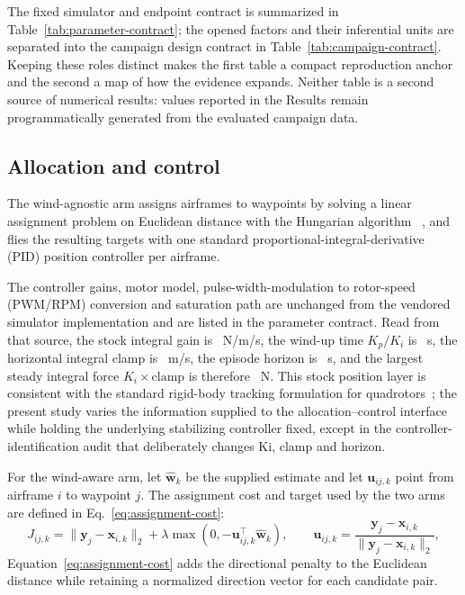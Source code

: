 The fixed simulator and endpoint contract is summarized in
Table~\ref{tab:parameter-contract}; the opened factors and their inferential
units are separated into the campaign design contract in
Table~\ref{tab:campaign-contract}. Keeping these roles distinct makes the first
table a compact reproduction anchor and the second a map of how the evidence
expands. Neither table is a second source of numerical results: values reported
in the Results remain programmatically generated from the evaluated campaign data.



\subsection{Allocation and control}

The wind-agnostic arm assigns airframes to waypoints by solving a linear
assignment problem on Euclidean distance with the Hungarian algorithm
~\cite{kuhn1955hungarian,gerkey2004formal,dias2006market,choi2009cbba}, and flies
the resulting targets with one standard proportional-integral-derivative (PID)
position controller per airframe.

The controller gains, motor model, pulse-width-modulation to rotor-speed (PWM/RPM) conversion and saturation path are
unchanged from the vendored simulator implementation and are listed in the
parameter contract. Read from that source, the stock integral gain is
\StockKi{}~N/m/s, the wind-up time $K_p/K_i$ is \IntegralTauS{}~s, the
horizontal integral clamp is \IntegralClampXy{}~m/s, the episode horizon is
\EpisodeHorizonS{}~s, and the largest steady integral force
$K_i\times\mathrm{clamp}$ is therefore \MaxSteadyIntegralForceN{}~N. This
stock position layer is consistent with the standard
rigid-body tracking formulation for quadrotors~\cite{lee2010se3}; the present
study varies the information supplied to the allocation--control interface while
holding the underlying stabilizing controller fixed, except in the
controller-identification audit that deliberately changes Ki, clamp and
horizon.

For the wind-aware arm, let $\widehat{\mathbf w}_k$ be the supplied estimate and let
$\mathbf{u}_{ij,k}$ point from airframe $i$ to waypoint $j$. The assignment cost
and target used by the two arms are defined in Eq.~\eqref{eq:assignment-cost}:
\begin{equation}
  J_{ij,k}=\lVert\mathbf{y}_j-\mathbf{x}_{i,k}\rVert_2
  +\lambda\max\!\left(0,-\mathbf{u}_{ij,k}^{\top}\widehat{\mathbf w}_k\right),
  \qquad
  \mathbf{u}_{ij,k}=\frac{\mathbf{y}_j-\mathbf{x}_{i,k}}
  {\lVert\mathbf{y}_j-\mathbf{x}_{i,k}\rVert_2},
  \label{eq:assignment-cost}
\end{equation}
Equation~\eqref{eq:assignment-cost} adds the directional penalty to the Euclidean
distance while retaining a normalized direction vector for each candidate pair.

